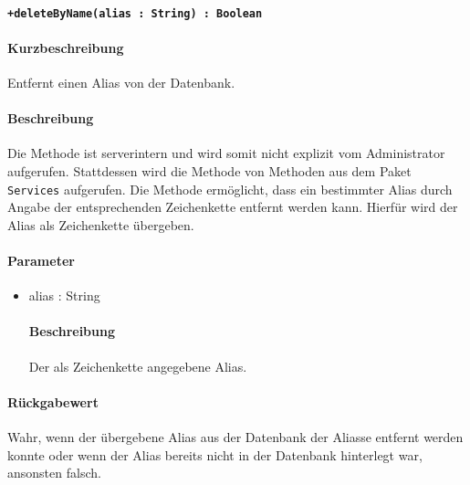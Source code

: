 \paragraph*{\texttt{+deleteByName(alias : String) : Boolean}}%
\paragraph*{Kurzbeschreibung}
Entfernt einen Alias von der Datenbank.
\paragraph*{Beschreibung}
Die Methode ist serverintern und wird somit nicht explizit vom Administrator aufgerufen.
Stattdessen wird die Methode von Methoden aus dem Paket \texttt{Services} aufgerufen.
Die Methode ermöglicht, dass ein bestimmter Alias durch Angabe der entsprechenden Zeichenkette entfernt werden kann.
Hierfür wird der Alias als Zeichenkette übergeben.
\paragraph*{Parameter}
\begin{itemize}
    \item alias : String
    		\paragraph*{Beschreibung}
    		Der als Zeichenkette angegebene Alias.
\end{itemize}
\paragraph*{Rückgabewert}
Wahr, wenn der übergebene Alias aus der Datenbank der Aliasse entfernt werden konnte oder wenn der Alias bereits nicht in der Datenbank hinterlegt war, ansonsten falsch.
